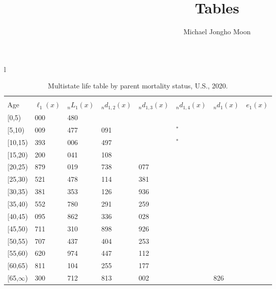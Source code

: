 \documentclass[
]{article}
\title{Tables}
\author{Michael Jongho Moon}
\date{}
\begin{document}
\maketitle

\begin{table}
\caption{\label{tab:table-all}Multistate life table by parent mortality status, U.S., 2020.}

\centering
\fontsize{9}{11}\selectfont
\begin{tabular}[t]{l}
\hline
\begin{tabular}{>{\raggedright\arraybackslash}p{.45in}>{\raggedleft\arraybackslash}p{.65in}>{\raggedleft\arraybackslash}p{.65in}>{\raggedleft\arraybackslash}p{.65in}>{\raggedleft\arraybackslash}p{.65in}>{\raggedleft\arraybackslash}p{.65in}>{\raggedleft\arraybackslash}p{.65in}>{\raggedleft\arraybackslash}p{.65in}}
\toprule
\multicolumn{1}{c}{ } & \multicolumn{7}{c}{(1) Lost neither} \\
\cmidrule(l{3pt}r{3pt}){2-8}
Age & $\ell_{1}(x)$ & ${}_nL_{1}(x)$ & ${}_nd_{1,2}(x)$ & ${}_nd_{1,3}(x)$ & ${}_nd_{1,4}(x)$ & ${}_nd_{1}(x)$ & $e_{1}(x)$\\
\midrule
{}[0,5) & 100 000 & 494 480 & 940 & 377 & 54 & 619 & 43\\
{}[5,10) & 98 009 & 486 477 & 1 091 & 466 & 7$^{*}$ & 53 & 39\\
{}[10,15) & 96 393 & 477 006 & 1 497 & 598 & 19$^{*}$ & 78 & 34\\
{}[15,20) & 94 200 & 463 041 & 2 108 & 913 & 30 & 271 & 29\\
{}[20,25) & 90 879 & 442 019 & 2 738 & 1 077 & 63 & 481 & 24\\
\addlinespace
{}[25,30) & 86 521 & 415 478 & 3 114 & 1 381 & 60 & 584 & 20\\
{}[30,35) & 81 381 & 381 353 & 4 126 & 1 936 & 85 & 681 & 16\\
{}[35,40) & 74 552 & 338 780 & 5 291 & 2 259 & 160 & 747 & 12\\
{}[40,45) & 66 095 & 283 862 & 6 336 & 3 028 & 230 & 789 & 9\\
{}[45,50) & 55 711 & 222 310 & 6 898 & 2 926 & 329 & 850 & 6\\
\addlinespace
{}[50,55) & 44 707 & 154 437 & 7 404 & 3 253 & 564 & 866 & 3\\
{}[55,60) & 32 620 & 91 974 & 6 447 & 3 112 & 472 & 779 & 2\\
{}[60,65) & 21 811 & 42 104 & 4 255 & 2 177 & 557 & 521 & 1\\
{}[65,$\infty$) & 14 300 & 33 712 & 3 813 & 2 002 & 950 & 1 826 & 0\\

\end{tabular}
\end{tabular}
\end{table}
\end{document}
